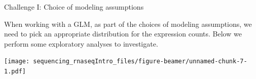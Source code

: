 \documentclass[ignorenonframetext,]{beamer}
\newenvironment{Shaded}{\begin{snugshade}}{\end{snugshade}}
\newcommand{\DataTypeTok}[1]{\textcolor[rgb]{0.13,0.29,0.53}{#1}}
\newcommand{\DecValTok}[1]{\textcolor[rgb]{0.00,0.00,0.81}{#1}}
\newcommand{\KeywordTok}[1]{\textcolor[rgb]{0.13,0.29,0.53}{\textbf{#1}}}
\newcommand{\NormalTok}[1]{#1}
\newcommand{\OperatorTok}[1]{\textcolor[rgb]{0.81,0.36,0.00}{\textbf{#1}}}
\newcommand{\StringTok}[1]{\textcolor[rgb]{0.31,0.60,0.02}{#1}}
\begin{document}
\begin{frame}[fragile]{Challenge I: Choice of modeling assumptions}
\protect\hypertarget{challenge-i-choice-of-modeling-assumptions}{}

When working with a GLM, as part of the choices of modeling assumptions,
we need to pick an appropriate distribution for the expression counts.
Below we perform some exploratory analyses to investigate.

\begin{Shaded}
\end{Shaded}

\texttt{[image: sequencing\_rnaseqIntro\_files/figure-beamer/unnamed-chunk-7-1.pdf]}


\end{frame}
\end{document}
